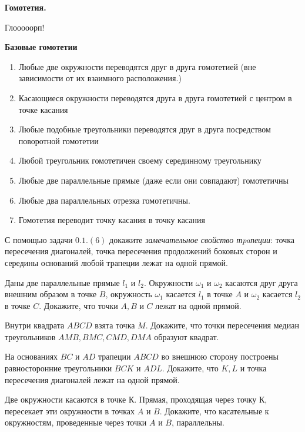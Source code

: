 \centerline{\bf \Huge }
\centerline{\bf \Huge Гомотетия.}

\begin{flushright}
        \scriptsize{Глооооорп!}
\end{flushright}

\textbf{Базовые гомотетии}
\begin{enumerate}
    \item Любые две окружности переводятся друг в друга гомотетией (вне зависимости от их взаимного расположения.)
    \item Касающиеся окружности переводятся друга в друга гомотетией с центром в точке касания
    \item Любые подобные треугольники переводятся друг в друга посредством поворотной гомотетии
    \item Любой треугольник гомотетичен своему серединному треугольнику
    \item Любые две параллельные прямые (даже если они совпадают) гомотетичны
    \item Любые два параллельных отрезка гомотетичны.
    \item Гомотетия переводит точку касания в точку касания
\end{enumerate}

С помощью задачи $0.1.(6)$ докажите \textit{замечательное свойство тpaпеции}: точка пересечения диагоналей, точка пересечения продолжений боковых сторон и середины оснований любой трапеции лежат на одной прямой.


Даны две параллельные прямые $l_1$ и $l_2$. Окружности $\omega_1$ и $\omega_2$ касаются друг друга внешним образом в точке $B$, окружность $\omega_1$ касается $l_1$ в точке $A$ и $\omega_2$ касается $l_2$ в точке $C$. Докажите, что точки $A,B \text{ и } C$ лежат на одной прямой.

Внутри квадрата $ABCD$ взята точка $M$. Докажите, что точки пересечения медиан треугольников $AMB, BMC, CMD, DMA$ образуют квадрат.

На основаниях $BC$ и $AD$ трапеции $ABCD$ во внешнюю сторону построены равносторонние треугольники $BCK$ и $ADL$. Докажите, что $K,L$ и точка пересечения диагоналей лежат на одной прямой.

Две окружности касаются в точке $К$. Прямая, проходящая через точку $К$, пересекает эти окружности в точках $A$ и $B$. Докажите, что касательные к окружностям, проведенные через точки $A$ и $B$, параллельны.

